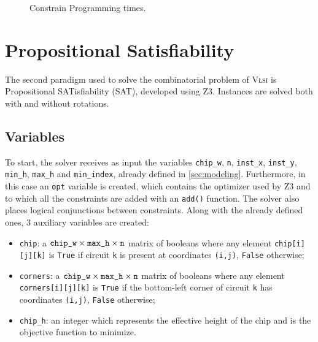 \documentclass[a4paper, 12pt]{article}
\begin{document}
\begin{figure}
    \centering
    \caption{Constrain Programming times.}
    \label{fig:cp}
\end{figure}


\clearpage


\section{Propositional Satisfiability}\label{sec:sat}

The second paradigm used to solve the combinatorial problem of \textsc{Vlsi} is Propositional SATisfiability (SAT), developed using Z3. Instances are solved both with and without rotations.


\subsection{Variables}\label{sec:sat-variables}

To start, the solver receives as input the variables \verb|chip_w|, \verb|n|, \verb|inst_x|, \verb|inst_y|, \verb|min_h|, \verb|max_h| and \verb|min_index|, already defined in \cref{sec:modeling}. Furthermore, in this case an \verb|opt| variable is created, which contains the optimizer used by Z3 and to which all the constraints are added with an \verb|add()| function. The solver also places logical conjunctions between constraints. Along with the already defined ones, 3 auxiliary variables are created:
\begin{itemize}
    \item \verb|chip|: a $\texttt{chip\symbol{95}w} \times \texttt{max\symbol{95}h} \times \texttt{n}$ matrix of booleans where any element \verb|chip[i][j][k]| is \verb|True| if circuit \verb|k| is present at coordinates \verb|(i,j)|, \verb|False| otherwise;
    \item \verb|corners|: a $\texttt{chip\symbol{95}w} \times \texttt{max\symbol{95}h} \times \texttt{n}$ matrix of booleans where any element \verb|corners[i][j][k]| is \verb|True| if the bottom-left corner of circuit \verb|k| has coordinates \verb|(i,j)|, \verb|False| otherwise;
    \item \verb|chip_h|: an integer which represents the effective height of the chip and is the objective function to minimize.
\end{itemize}
\end{document}
